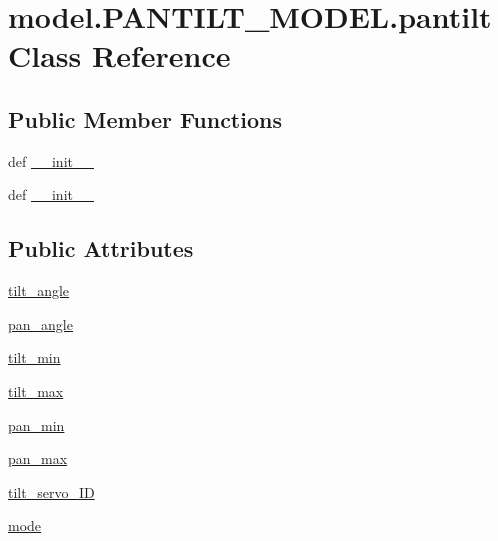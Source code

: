 \hypertarget{classmodel_1_1PANTILT__MODEL_1_1pantilt}{}\section{model.\+P\+A\+N\+T\+I\+L\+T\+\_\+\+M\+O\+D\+E\+L.\+pantilt Class Reference}
\label{classmodel_1_1PANTILT__MODEL_1_1pantilt}
\subsection*{Public Member Functions}
\begin{DoxyCompactItemize}
\item 
def \hyperlink{classmodel_1_1PANTILT__MODEL_1_1pantilt_a427ce8d85390b98a65fba754b394f37a}{\+\_\+\+\_\+init\+\_\+\+\_\+}
\item 
def \hyperlink{classmodel_1_1PANTILT__MODEL_1_1pantilt_a427ce8d85390b98a65fba754b394f37a}{\+\_\+\+\_\+init\+\_\+\+\_\+}
\end{DoxyCompactItemize}
\subsection*{Public Attributes}
\begin{DoxyCompactItemize}
\item 
\hyperlink{classmodel_1_1PANTILT__MODEL_1_1pantilt_a7833827d59e9bd6212b147b90ba923e7}{tilt\+\_\+angle}
\item 
\hyperlink{classmodel_1_1PANTILT__MODEL_1_1pantilt_a3c9ae4ae2bfb981b9258752f8baf9878}{pan\+\_\+angle}
\item 
\hyperlink{classmodel_1_1PANTILT__MODEL_1_1pantilt_abed248a0b87a8f060c65e185125cea09}{tilt\+\_\+min}
\item 
\hyperlink{classmodel_1_1PANTILT__MODEL_1_1pantilt_a774886c6a767076f047395c605e1262f}{tilt\+\_\+max}
\item 
\hyperlink{classmodel_1_1PANTILT__MODEL_1_1pantilt_adf70a2a96aab83f9a9557c0aae51bfbb}{pan\+\_\+min}
\item 
\hyperlink{classmodel_1_1PANTILT__MODEL_1_1pantilt_a1ba69acbc76ac90737dd509da61762be}{pan\+\_\+max}
\item 
\hyperlink{classmodel_1_1PANTILT__MODEL_1_1pantilt_ab0d3687530a05750330e616d8cd902b9}{tilt\+\_\+servo\+\_\+\+I\+D}
\item 
\hyperlink{classmodel_1_1PANTILT__MODEL_1_1pantilt_a3516dc36ca1b80a3fcd01f8a88cd4974}{mode}
\end{DoxyCompactItemize}


